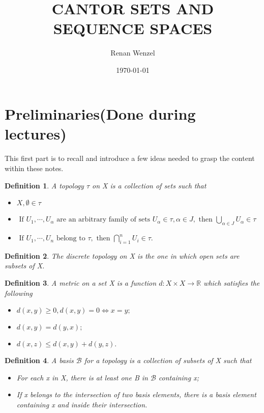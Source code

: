 \documentclass{article}
\title{CANTOR SETS AND SEQUENCE SPACES}
\author{Renan Wenzel}
\date{\today}
\newtheorem*{def*}{Definition}
\begin{document}
\maketitle
\tableofcontents
\newpage
\section{Preliminaries(Done during lectures)}

\paragraph{} This first part is to recall and introduce a few ideas needed to grasp the content within these notes.

\begin{def*}
  A topology $\tau$ on X is a collection of sets such that
\end{def*}
\begin{itemize}
  \item[i)] $X, \emptyset\in{\tau}$
  \item[ii)] $\text{ If } U _{1}, \cdots, U _{\alpha} \text{ are an arbitrary family of sets } U _{\alpha}\in{\tau}, 
  \alpha\in{J}, \text{ then } \bigcup _{\alpha\in{J}}U _{\alpha}\in{\tau}$
  \item[iii)] $\text{ If } U _{1}, \cdots, U _{n} \text{ belong to } \tau, \text{ then } \bigcap _{i=1}^{n}U _{i}\in{\tau}.$
\end{itemize}

\begin{def*}
  The discrete topology on X is the one in which open sets are subsets of X.
\end{def*}

\begin{def*}
  A metric on a set X is a function $d:X\times{X}\rightarrow \mathbb{R}$ which satisfies the following
\end{def*}
\begin{itemize}
  \item[i)] $d(x, y)\geq{0}, d(x, y) = 0\Longleftrightarrow x = y;$
  \item[ii)] $d(x, y) = d(y, x);$ 
  \item[iii)] $d(x, z) \leq d(x, y) + d(y, z).$
\end{itemize}

\begin{def*}
  A basis $\mathcal{B}$ for a topology is a collection of subsets of X such that
 \begin{itemize}
   \item[i)] For each x in X, there is at least one B in $\mathcal{B}$ containing x;
   \item[ii)] If x belongs to the intersection of two basis elements, there is a basis element containing x and inside their intersection.
 \end{itemize}
\end{def*}
\end{document}
